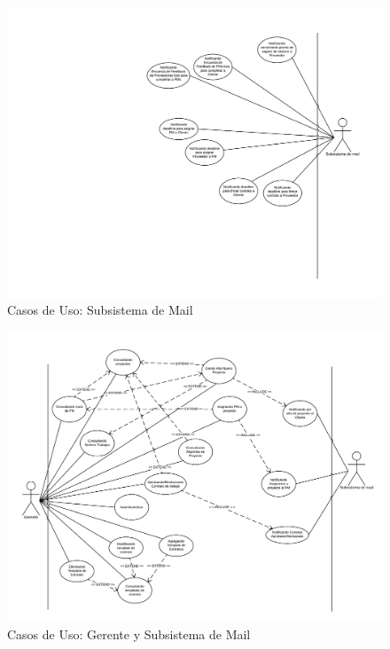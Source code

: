 \begin{figure}[H]
    \centering
    \includegraphics[width=\linewidth]{diag/viejos/cu3.pdf}
    \caption{Casos de Uso: Subsistema de Mail}
    \label{cu3}
\end{figure}

\begin{figure}[H]
    \centering
    \includegraphics[width=\linewidth]{diag/viejos/cu4.pdf}
    \caption{Casos de Uso: Gerente y Subsistema de Mail}
    \label{cu4}
\end{figure}

